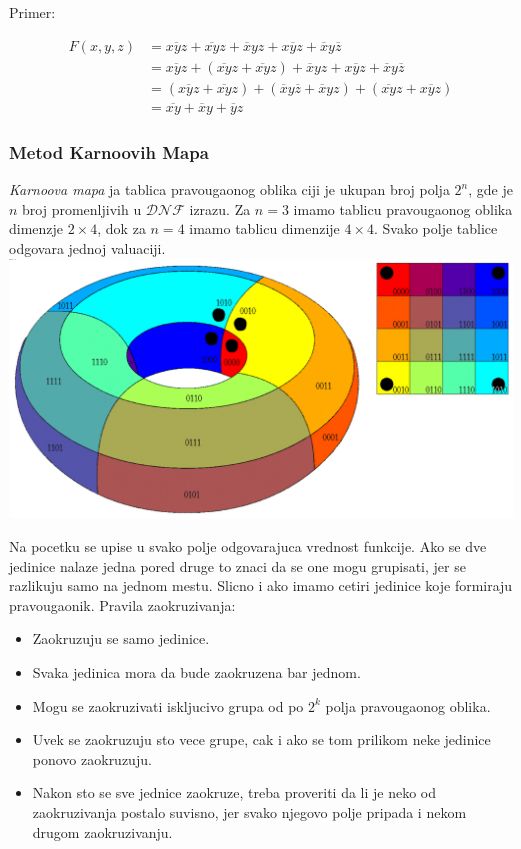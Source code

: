 \documentclass[12p,a4paper]{article}
\begin{document}
\begin{multicols}{2}
    Primer:

    \begin{align*}
        F(x, y, z) &=
        \overline{xyz} + \overline{xy}z + \overline{x}yz + 
        x\overline{y}z + \overline{x}y\overline{z} \\
        &= \overline{xyz} + (\overline{xy}z + \overline{xy}z) + 
        \overline{x}yz + x\overline{y}z + \overline{x}y\overline{z} \\
        &= (\overline{xyz} + \overline{xy}z) + 
        (\overline{x}y\overline{z} + \overline{x}yz) + 
        (\overline{xy}z +  x\overline{y}z) \\
        &= \overline{xy} + \overline{x}y + \overline{y}z
    \end{align*}

    \subsubsection{Metod Karnoovih Mapa}

    \emph{Karnoova mapa} ja tablica pravougaonog oblika ciji je ukupan broj 
    polja $2^n$, gde je $n$ broj promenljivih u $\mathcal{DNF}$ izrazu.
    Za $n = 3$ imamo tablicu pravougaonog oblika dimenzje $2 \times 4$, dok za 
    $n = 4$ imamo tablicu dimenzije $4 \times 4$. Svako polje tablice odgovara 
    jednoj valuaciji.
    \includegraphics[width=\columnwidth]{Figures/torus.png}

    Na pocetku se upise u svako polje odgovarajuca vrednost funkcije.
    Ako se dve jedinice nalaze jedna pored druge to znaci da se one mogu 
    grupisati, jer se razlikuju samo na jednom mestu.
    Slicno i ako imamo cetiri jedinice koje formiraju pravougaonik.
    Pravila zaokruzivanja:
    \begin{itemize}
        \itemsep0em
        \item Zaokruzuju se samo jedinice.
        \item Svaka jedinica mora da bude zaokruzena bar jednom.
        \item Mogu se zaokruzivati iskljucivo grupa od po $2^k$ polja 
              pravougaonog oblika.
        \item Uvek se zaokruzuju sto vece grupe, cak i ako se tom prilikom 
              neke jedinice ponovo zaokruzuju.
        \item Nakon sto se sve jednice zaokruze, treba proveriti da li je 
              neko od zaokruzivanja postalo suvisno, jer svako njegovo polje 
              pripada i nekom drugom zaokruzivanju.
    \end{itemize}


\end{multicols}
\end{document}
